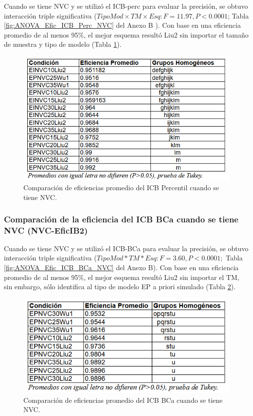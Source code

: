 Cuando se tiene NVC y se utilizó el ICB-perc para evaluar la precisión, se obtuvo interacción triple significativa ($TipoMod \times TM \times Esq: F=11.97, P<0.0001$; Tabla \ref{fig:ANOVA_Efic_ICB_Perc_NVC} del Anexo B ). Con base en una eficiencia promedio de al menos 95\%, el mejor esquema resultó Liu2 sin importar el tamaño de muestra y tipo de modelo (Tabla \ref{fig:CompEfic_PromICB_Perc_NVC}).\\


\begin{figure}[ht] 
	\centering 
	\includegraphics[width=0.76\linewidth]{img/CompEfic_PromICB_Perc_NVC.png} 
	\caption{Comparación de eficiencias promedio del ICB Percentil cuando se tiene NVC.} 
	\label{fig:CompEfic_PromICB_Perc_NVC}
\end{figure}
\FloatBarrier



\subsubsection{Comparación de la eficiencia del ICB BCa cuando se tiene NVC (NVC-EficIB2)}

Cuando se tiene NVC y se utilizó el ICB-BCa para evaluar la precisión, se obtuvo interacción triple significativa ($TipoMod*TM*Esq: F=3.60, P<0.0001;$ Tabla \ref{fig:ANOVA_Efic_ICB_BCa_NVC} del Anexo B). Con base en una eficiencia promedio de al menos 95\%, el mejor esquema resultó Liu2 sin importar el TM, sin embargo, sólo identifica al tipo de modelo EP a priori simulado (Tabla \ref{fig:CompEfic_PromICB_BCa_NVC}).\\



\begin{figure}[ht] 
	\centering 
	\includegraphics[width=0.76\linewidth]{img/CompEfic_PromICB_BCa_NVC.png} 
	\caption{Comparación de eficiencias promedio del ICB BCa cuando se tiene NVC.} 
	\label{fig:CompEfic_PromICB_BCa_NVC}
\end{figure}
\FloatBarrier



